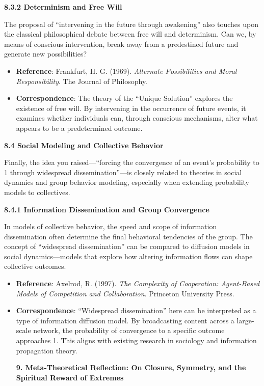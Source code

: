 \documentclass[
]{article}
\begin{document}
\textbf{8.3.2 Determinism and Free Will}

The proposal of ``intervening in the future through awakening'' also
touches upon the classical philosophical debate between free will and
determinism. Can we, by means of conscious intervention, break away from
a predestined future and generate new possibilities?

\begin{itemize}
\item
  \textbf{Reference}: Frankfurt, H. G. (1969). \emph{Alternate
  Possibilities and Moral Responsibility}. The Journal of Philosophy.
\item
  \textbf{Correspondence}: The theory of the ``Unique Solution''
  explores the existence of free will. By intervening in the occurrence
  of future events, it examines whether individuals can, through
  conscious mechanisms, alter what appears to be a predetermined
  outcome.
\end{itemize}

\textbf{8.4 Social Modeling and Collective Behavior}

Finally, the idea you raised---``forcing the convergence of an event's
probability to 1 through widespread dissemination''---is closely related
to theories in social dynamics and group behavior modeling, especially
when extending probability models to collectives.

\textbf{8.4.1 Information Dissemination and Group Convergence}

In models of collective behavior, the speed and scope of information
dissemination often determine the final behavioral tendencies of the
group. The concept of ``widespread dissemination'' can be compared to
diffusion models in social dynamics---models that explore how altering
information flows can shape collective outcomes.

\begin{itemize}
\item
  \textbf{Reference}: Axelrod, R. (1997). \emph{The Complexity of
  Cooperation: Agent-Based Models of Competition and Collaboration}.
  Princeton University Press.
\item
  \textbf{Correspondence}: ``Widespread dissemination'' here can be
  interpreted as a type of information diffusion model. By broadcasting
  content across a large-scale network, the probability of convergence
  to a specific outcome approaches 1. This aligns with existing research
  in sociology and information propagation theory.

  \textbf{9. Meta-Theoretical Reflection: On Closure, Symmetry, and the
  Spiritual Reward of Extremes}
\end{itemize}
\end{document}

